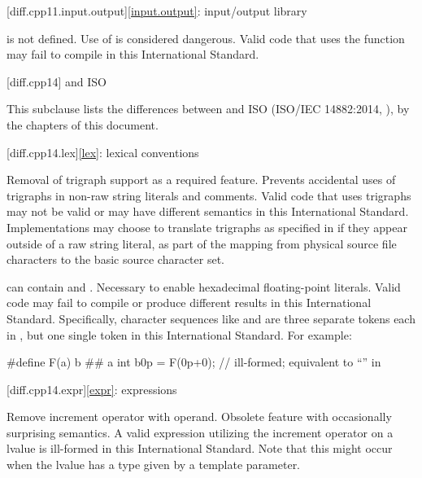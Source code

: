 [diff.cpp11.input.output]{\ref{input.output}: input/output library}

\change
{} is not defined.
\rationale
Use of  is considered dangerous.
\effect
Valid \CppXI{} code that uses the  function may fail to compile
in this International Standard.

[diff.cpp14]{\Cpp{} and ISO \CppXIV{}}

\pnum
{}%
This subclause lists the differences between \Cpp{} and
ISO \CppXIV{} (ISO/IEC 14882:2014, ),
by the chapters of this document.

[diff.cpp14.lex]{\ref{lex}: lexical conventions}

%
\change
Removal of trigraph support as a required feature.
\rationale
Prevents accidental uses of trigraphs in non-raw string literals and comments.
\effect
Valid \CppXIV{} code that uses trigraphs may not be valid or may have different
semantics in this International Standard. Implementations may choose to
translate trigraphs as specified in \CppXIV{} if they appear outside of a raw
string literal, as part of the  mapping from physical source file characters to
the basic source character set.

\change
{} can contain   and
 .
\rationale
Necessary to enable hexadecimal floating-point literals.
\effect
Valid \CppXIV{} code may fail to compile or produce different results in
this International Standard. Specifically, character sequences like 
and  are three separate tokens each in \CppXIV{}, but one single token
in this International Standard.
For example:
\begin{codeblock}
#define F(a) b ## a
int b0p = F(0p+0);  // ill-formed; equivalent to ``\!'' in \CppXIV{}
\end{codeblock}

[diff.cpp14.expr]{\ref{expr}: expressions}

\change
Remove increment operator with  operand.
\rationale
Obsolete feature with occasionally surprising semantics.
\effect
A valid \CppXIV{} expression utilizing the increment operator on
a  lvalue is ill-formed in this International Standard.
Note that this might occur when the lvalue has a type given by a template
parameter.

